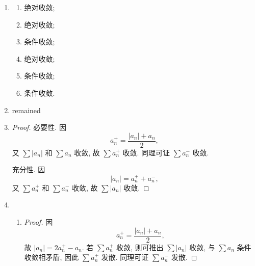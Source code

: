 % 
\begin{enumerate}
    \item %
        \begin{multicols}{3}
            \begin{enumerate}[(1)]
                \item %
                    绝对收敛;
                \item %
                    绝对收敛;
                \item %
                    条件收敛;
                \item %
                    绝对收敛;
                \item %
                    条件收敛;
                \item %
                    条件收敛.
            \end{enumerate}
        \end{multicols}
    \item %
        {\color{red}remained}
    \item %
        \begin{proof}
            必要性. 因
            \[
                a_n^+ = \frac{|a_n| + a_n}{2},    
            \]
            又 $\sum|a_n|$ 和 $\sum a_n$ 收敛, 故 $\sum a_n^+$ 收敛. 同理可证 $\sum a_n^-$ 收敛.

            充分性. 因
            \[
                |a_n| = a_n^+ + a_n^-,    
            \]
            又 $\sum a_n^+$ 和 $\sum a_n^-$ 收敛, 故 $\sum|a_n|$ 收敛.
        \end{proof}
    \item %
        \begin{enumerate}[(1)]
            \item %
                \begin{proof}
                    因
                    \[
                        a_n^+ = \frac{|a_n| + a_n}{2},   
                    \]
                    故 $|a_n| = 2a_n^+ - a_n$. 若 $\sum{a_n^+}$ 收敛, 则可推出 $\sum|a_n|$ 收敛, 与 $\sum{a_n}$ 条件收敛相矛盾, 因此 $\sum{a_n^+}$ 发散.
                    同理可证 $\sum{a_n^-}$ 发散.
                    

\end{proof}
\end{enumerate}
\end{enumerate}
